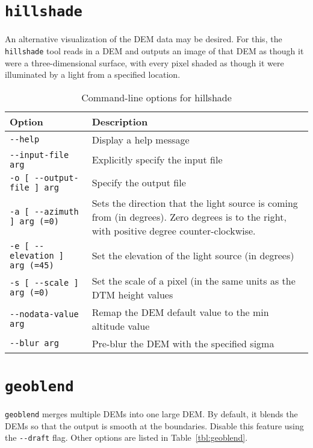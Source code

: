 \section{{\tt hillshade}}\label{sec:hillshade}

An alternative visualization of the DEM data may be desired. For this,
the \verb#hillshade# tool reads in a DEM and outputs an image of that
DEM as though it were a three-dimensional surface, with every pixel
shaded as though it were illuminated by a light from a specified
location.

\begin{longtable}{|l|p{11cm}|} 
\caption{Command-line options for hillshade}
\label{tbl:hillshade}
\endfirsthead
\endhead
\endfoot
\endlastfoot
\hline
Option & Description \\ \hline \hline
\verb#--help# & Display a help message\\ \hline
\verb#--input-file arg# & Explicitly specify the input file\\ \hline
\verb#-o [ --output-file ] arg# & Specify the output file\\ \hline
\verb#-a [ --azimuth ] arg (=0)# & Sets the direction that the light source is coming from (in degrees).  Zero degrees is to the right, with positive degree counter-clockwise.\\ \hline
\verb#-e [ --elevation ] arg (=45)# & Set the elevation of the light source (in degrees)\\ \hline
\verb#-s [ --scale ] arg (=0)# & Set the scale of a pixel (in the same units as the DTM height values\\ \hline
\verb#--nodata-value arg# & Remap the DEM default value to the min altitude value\\ \hline
\verb#--blur arg# & Pre-blur the DEM with the specified sigma\\ \hline
\end{longtable}


\section{{\tt geoblend}}\label{sec:geoblend}

\verb#geoblend# merges multiple DEMs into one large DEM.  By default, it blends the DEMs so that the output is smooth at the boundaries.  Disable this feature using the \verb#--draft# flag.  Other options are listed in Table~\ref{tbl:geoblend}.

